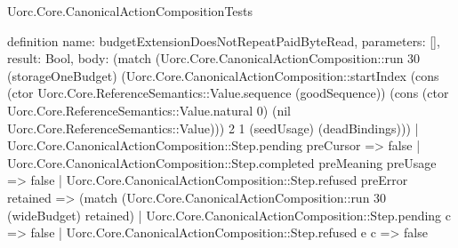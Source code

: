 \begin{lexlean}{Uorc.Core.CanonicalActionCompositionTests}
\begin{semanticmodule}
definition{
  name: budgetExtensionDoesNotRepeatPaidByteRead,
  parameters: [],
  result: Bool,
  body: (match (Uorc.Core.CanonicalActionComposition::run 30 (storageOneBudget) (Uorc.Core.CanonicalActionComposition::startIndex (cons (ctor Uorc.Core.ReferenceSemantics::Value.sequence (goodSequence)) (cons (ctor Uorc.Core.ReferenceSemantics::Value.natural 0) (nil Uorc.Core.ReferenceSemantics::Value))) 2 1 (seedUsage) (deadBindings)))
    | Uorc.Core.CanonicalActionComposition::Step.pending preCursor => false
    | Uorc.Core.CanonicalActionComposition::Step.completed preMeaning preUsage => false
    | Uorc.Core.CanonicalActionComposition::Step.refused preError retained => (match (Uorc.Core.CanonicalActionComposition::run 30 (wideBudget) retained)
      | Uorc.Core.CanonicalActionComposition::Step.pending c => false
      | Uorc.Core.CanonicalActionComposition::Step.refused e c => false
}
\end{semanticmodule}
\end{lexlean}
